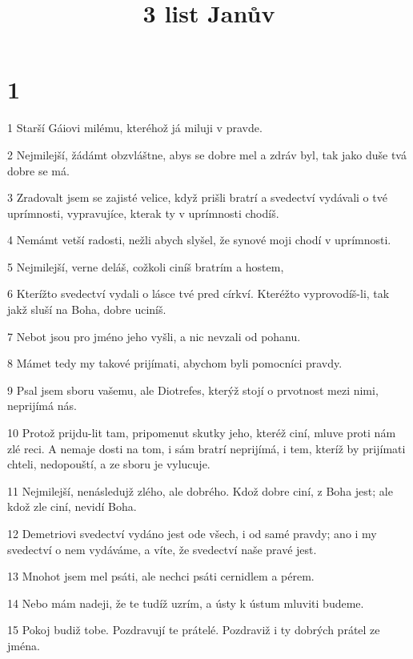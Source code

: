 

\title{3 list Janův}

\chapter{1}

\par 1 Starší Gáiovi milému, kteréhož já miluji v pravde.
\par 2 Nejmilejší, žádámt obzvláštne, abys se dobre mel a zdráv byl, tak jako duše tvá dobre se má.
\par 3 Zradovalt jsem se zajisté velice, když prišli bratrí a svedectví vydávali o tvé uprímnosti, vypravujíce, kterak ty v uprímnosti chodíš.
\par 4 Nemámt vetší radosti, nežli abych slyšel, že synové moji chodí v uprímnosti.
\par 5 Nejmilejší, verne deláš, cožkoli ciníš bratrím a hostem,
\par 6 Kterížto svedectví vydali o lásce tvé pred církví. Kteréžto vyprovodíš-li, tak jakž sluší na Boha, dobre uciníš.
\par 7 Nebot jsou pro jméno jeho vyšli, a nic nevzali od pohanu.
\par 8 Mámet tedy my takové prijímati, abychom byli pomocníci pravdy.
\par 9 Psal jsem sboru vašemu, ale Diotrefes, kterýž stojí o prvotnost mezi nimi, neprijímá nás.
\par 10 Protož prijdu-lit tam, pripomenut skutky jeho, kteréž ciní, mluve proti nám zlé reci. A nemaje dosti na tom, i sám bratrí neprijímá, i tem, kteríž by prijímati chteli, nedopouští, a ze sboru je vylucuje.
\par 11 Nejmilejší, nenásledujž zlého, ale dobrého. Kdož dobre ciní, z Boha jest; ale kdož zle ciní, nevidí Boha.
\par 12 Demetriovi svedectví vydáno jest ode všech, i od samé pravdy; ano i my svedectví o nem vydáváme, a víte, že svedectví naše pravé jest.
\par 13 Mnohot jsem mel psáti, ale nechci psáti cernidlem a pérem.
\par 14 Nebo mám nadeji, že te tudíž uzrím, a ústy k ústum mluviti budeme.
\par 15 Pokoj budiž tobe. Pozdravují te prátelé. Pozdraviž i ty dobrých prátel ze jména.


